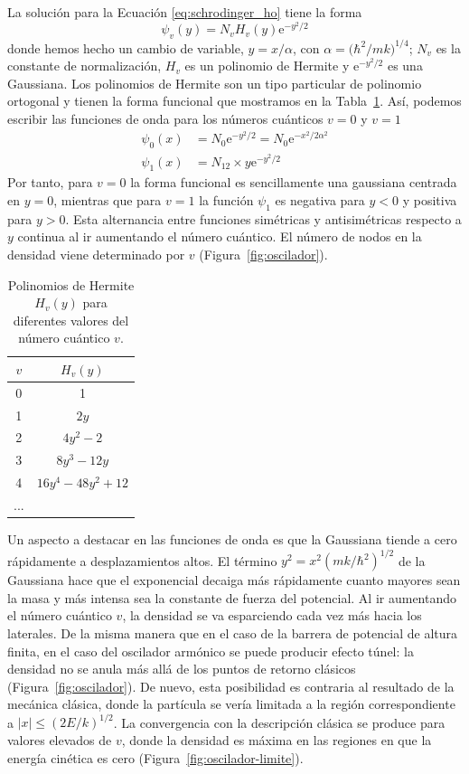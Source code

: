 \documentclass{tufte-handout}
\begin{document}
La solución para la Ecuación \ref{eq:schrodinger_ho} 
tiene la forma
\begin{equation}
    \psi_v(y)=N_vH_v(y)\mathrm{e}^{-y^2/2}
\end{equation}
donde hemos hecho un cambio de variable, $y=x/\alpha$, 
con $\alpha=\big(\hbar^2/mk\big)^{1/4}$; $N_v$ es
la constante de normalización, $H_v$ es un polinomio de
Hermite y $\mathrm{e}^{-y^2/2}$ es una Gaussiana. 
Los polinomios de Hermite  son un tipo particular de
polinomio ortogonal y tienen la forma funcional que
mostramos en la Tabla~\ref{tb:hermite}. Así, podemos
escribir las funciones de onda para los números
cuánticos $v=0$ y $v=1$ 
\begin{subequations}
    \begin{align}
        \psi_0(x)&=N_0\mathrm{e}^{-y^2/2}=N_0\mathrm{e}^{-x^2/2\alpha^2} \\
        \psi_1(x)&=N_12\times y\mathrm{e}^{-y^2/2}
    \end{align}
\end{subequations}
Por tanto, para $v=0$ la forma funcional es sencillamente
una gaussiana centrada en $y=0$, mientras que para $v=1$ 
la función $\psi_1$ es negativa para $y<0$ y positiva para
$y>0$. Esta alternancia  entre funciones simétricas y
antisimétricas respecto a $y$ continua al ir aumentando el
número cuántico. El número de nodos en la densidad viene
determinado por $v$ (Figura~\ref{fig:oscilador}).


\begin{table}[t!]
    \centering
    \begin{tabular}{c|c}
     $v$ & $H_v(y)$ \\
     \hline
    0 & 1\\ 
    1 & $2y$\\ 
    2 & $4y^2-2$\\ 
    3 & $8y^3-12y$\\ 
    4 & $16y^4 - 48y^2 + 12$\\
    ... & 
    \end{tabular}
    \caption{Polinomios de Hermite $H_v(y)$ para diferentes 
    valores del número cuántico $v$.}
    \label{tb:hermite}
\end{table}

Un aspecto a destacar en las funciones de onda es que la
Gaussiana tiende a cero rápidamente a desplazamientos altos.
El término  $y^2=x^2(mk/\hbar^2)^{1/2}$ de la Gaussiana hace
que el exponencial decaiga más rápidamente cuanto mayores
sean la masa y más intensa sea la constante de fuerza del
potencial. Al ir aumentando el número cuántico $v$, la
densidad se va esparciendo cada vez más hacia los
laterales. De la misma manera que en el caso de la
barrera de potencial de altura finita, en el caso del
oscilador armónico se puede producir efecto túnel: la
densidad no se anula más allá de los puntos de retorno
clásicos (Figura~\ref{fig:oscilador}). De nuevo, esta
posibilidad es contraria al resultado de la mecánica
clásica, donde la partícula se vería limitada a la región
correspondiente a $|x|\leq(2E/k)^{1/2}$.
La convergencia con la descripción clásica se produce para
valores elevados de $v$, donde la densidad es máxima en las
regiones en que la energía cinética es cero
(Figura~\ref{fig:oscilador-limite}).
\end{document}
